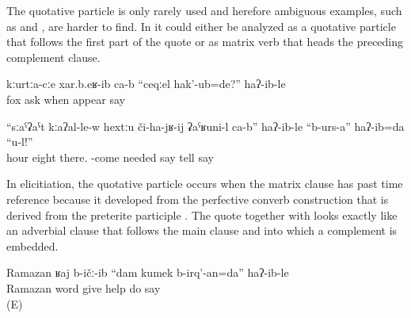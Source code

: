 The quotative particle  is only rarely used and herefore ambiguous examples, such as  and , are harder to find. In  it could either be analyzed as a quotative particle that follows the first part of the quote or as matrix verb that heads the preceding complement clause.
%
\begin{exe}
	\ex	\label{ex:They asked the fox, When were you born?, ...}
	\gll	kːurtːa-cːe	xar.b.eʁ-ib	ca-b	``ceqːel	hak'-ub=de?''	haʔ-ib-le\\
		fox	ask		when	appear	say\\
	\glt	{}

	\ex	\label{ex:‎‎‎It is necessary that he must come, at 8 he must be there, tell him this, I said}
	\gll	``sːaˁʡaˁt	kːaʔal-le-w	hextːu	či-ha-jʁ-ij	ʡaˁʁuni-l	ca-b''	haʔ-ib-le	``b-urs-a''	haʔ-ib=da	``u-l!''\\
		hour	eight	there.	-come	needed		say	tell	say	\\
	\glt	{}
\end{exe}

In elicitiation, the quotative particle  occurs when the matrix clause has past time reference because it developed from the perfective converb construction that is derived from the preterite participle . The quote together with  looks exactly like an adverbial clause that follows the main clause and into which a complement is embedded.
%
\begin{exe}
	\ex	\label{ex:‎‎‎Ramazan gave me his word, I'll help, he said}
	\gll	Ramazan	ʁaj	b-ičː-ib	``dam	kumek	b-irq'-an=da''	haʔ-ib-le\\
		Ramazan	word	give		help	do	say\\
	\glt	{} (E)
\end{exe}

